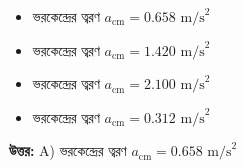 \documentclass[12pt, a4paper]{article}
\begin{document}
\vspace{1em}

\begin{itemize}[label={}, leftmargin=1cm, itemsep=0.5em]
    \item[\textbf{A)}] ভরকেন্দ্রের ত্বরণ $a_{\text{cm}} = 0.658\text{ m/s}^2$
    \item[\textbf{B)}] ভরকেন্দ্রের ত্বরণ $a_{\text{cm}} = 1.420\text{ m/s}^2$
    \item[\textbf{C)}] ভরকেন্দ্রের ত্বরণ $a_{\text{cm}} = 2.100\text{ m/s}^2$
    \item[\textbf{D)}] ভরকেন্দ্রের ত্বরণ $a_{\text{cm}} = 0.312\text{ m/s}^2$
\end{itemize}

\vspace{0.5em}
\begin{tcolorbox}[answerbox]
    \textbf{\color{success} উত্তর:} A) ভরকেন্দ্রের ত্বরণ $a_{\text{cm}} = 0.658\text{ m/s}^2$
\end{tcolorbox}
\vspace{1em}
\end{document}

